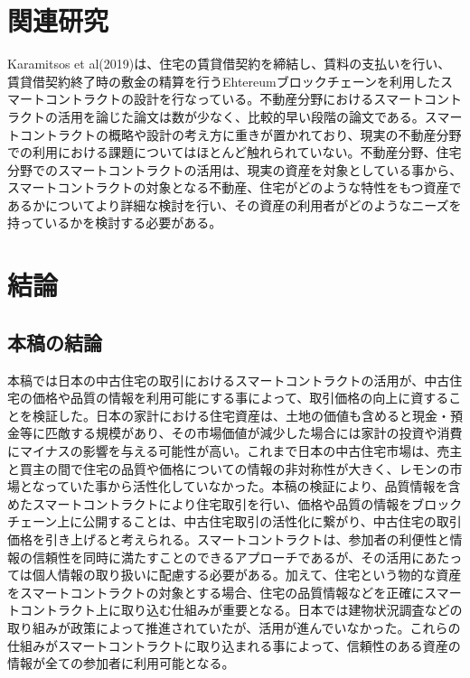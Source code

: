 \documentclass[a4paper,fontsize=11pt,report,notitlepage,line_length=38zw,number_of_lines=40,dvipdfmx]{jlreq}
\begin{document}
\chapter{関連研究}
Karamitsos et al(2019)\cite{karamitsos2019}は、住宅の賃貸借契約を締結し、賃料の支払いを行い、賃貸借契約終了時の敷金の精算を行うEhtereumブロックチェーンを利用したスマートコントラクトの設計を行なっている。不動産分野におけるスマートコントラクトの活用を論じた論文は数が少なく、比較的早い段階の論文である。スマートコントラクトの概略や設計の考え方に重きが置かれており、現実の不動産分野での利用における課題についてはほとんど触れられていない。不動産分野、住宅分野でのスマートコントラクトの活用は、現実の資産を対象としている事から、スマートコントラクトの対象となる不動産、住宅がどのような特性をもつ資産であるかについてより詳細な検討を行い、その資産の利用者がどのようなニーズを持っているかを検討する必要がある。

\chapter{結論}
\section{本稿の結論}
本稿では日本の中古住宅の取引におけるスマートコントラクトの活用が、中古住宅の価格や品質の情報を利用可能にする事によって、取引価格の向上に資することを検証した。日本の家計における住宅資産は、土地の価値も含めると現金・預金等に匹敵する規模があり、その市場価値が減少した場合には家計の投資や消費にマイナスの影響を与える可能性が高い。これまで日本の中古住宅市場は、売主と買主の間で住宅の品質や価格についての情報の非対称性が大きく、レモンの市場となっていた事から活性化していなかった。本稿の検証により、品質情報を含めたスマートコントラクトにより住宅取引を行い、価格や品質の情報をブロックチェーン上に公開することは、中古住宅取引の活性化に繋がり、中古住宅の取引価格を引き上げると考えられる。スマートコントラクトは、参加者の利便性と情報の信頼性を同時に満たすことのできるアプローチであるが、その活用にあたっては個人情報の取り扱いに配慮する必要がある。加えて、住宅という物的な資産をスマートコントラクトの対象とする場合、住宅の品質情報などを正確にスマートコントラクト上に取り込む仕組みが重要となる。日本では建物状況調査などの取り組みが政策によって推進されていたが、活用が進んでいなかった。これらの仕組みがスマートコントラクトに取り込まれる事によって、信頼性のある資産の情報が全ての参加者に利用可能となる。
\end{document}
